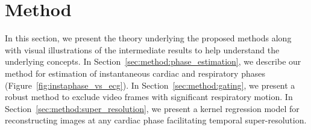 \documentclass[journal]{IEEEtran}
\begin{document}
\section{Method}
\label{sec:method}
%
In this section, we present the theory underlying the proposed methods along with visual illustrations of the intermediate results to help understand the underlying concepts. In Section~\ref{sec:method:phase_estimation}, we describe our method for estimation of instantaneous cardiac and respiratory phases  (Figure~\ref{fig:instaphase_vs_ecg}). In Section~\ref{sec:method:gating}, we present a robust method to exclude video frames with significant respiratory motion. In Section~\ref{sec:method:super_resolution}, we present a kernel regression model for reconstructing images at any cardiac phase facilitating temporal super-resolution.
%
\vspace{-0.3cm}
\end{document}
